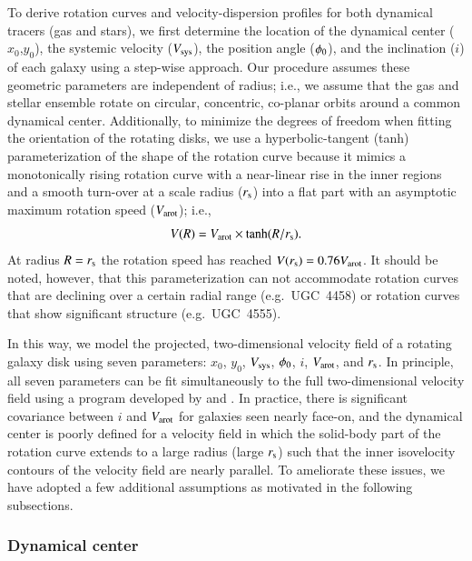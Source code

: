 \documentclass[traditabstract]{aa} %
\begin{document}
To derive rotation curves and velocity-dispersion profiles for both dynamical
tracers (gas and stars), we first determine the location of the dynamical center
($x_0$,$y_0$), the systemic velocity ($V_{\rm sys}$), the position angle ($\phi_0$), and
the inclination ($i$) of each galaxy using a step-wise approach.  Our procedure
assumes these geometric parameters are independent of radius; i.e., we
assume that the gas and stellar ensemble rotate on circular, concentric,
co-planar orbits around a common dynamical center.  Additionally, to minimize the
degrees of freedom when fitting the orientation of the rotating disks, we use a
hyperbolic-tangent (tanh) parameterization of the shape of the rotation curve
because it mimics a monotonically rising rotation curve with a near-linear rise
in the inner regions and a smooth turn-over at a scale radius ($r_{\rm s}$) into a
flat part with an asymptotic maximum rotation speed ($V_{\rm arot}$); i.e.,
%
\begin{equation}
%
V(R) = \arot \times \tanh(R/\rs ).
%
\label{eq:tanh}
%
\end{equation}
%
At radius $R=r_{\rm s}$ the rotation speed has reached $V(r_{\rm s})=0.76V_{\rm arot}$. It should
be noted, however, that this parameterization can not accommodate rotation
curves that are declining over a certain radial range (e.g.\ UGC~4458) or
rotation curves that show significant structure (e.g.\ UGC~4555).

In this way, we model the projected, two-dimensional velocity field of a rotating galaxy
disk using seven parameters: $x_0$, $y_0$, $V_{\rm sys}$, $\phi_0$, $i$, $V_{\rm arot}$, and $r_{\rm s}$. In
principle, all seven parameters can be fit simultaneously to the full two-dimensional
velocity field using a program developed by \citet{andersen2001phd} and 
\citet{andersen2003}. In practice, there is significant covariance between $i$ and $V_{\rm arot}$
for galaxies seen nearly face-on, and the dynamical center is poorly defined for a
velocity field in which the solid-body part of the rotation curve extends to a large
radius (large $r_{\rm s}$) such that the inner isovelocity contours of the velocity field are
nearly parallel. To ameliorate these issues, we have adopted a few additional assumptions
as motivated in the following subsections.


\subsubsection{Dynamical center}
\label{sec:center}
\end{document}
